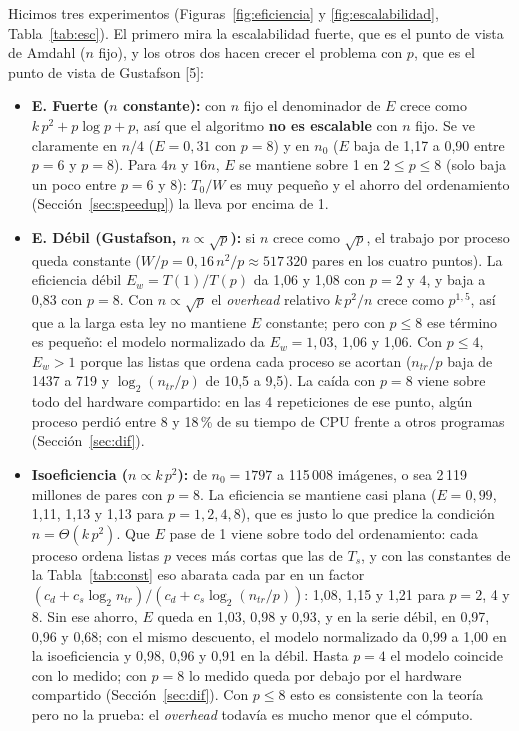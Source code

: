 \documentclass[11pt,a4paper]{article}
\newcommand{\ntr}{n_{tr}}
\begin{document}
Hicimos tres experimentos (Figuras~\ref{fig:eficiencia} y \ref{fig:escalabilidad}, Tabla~\ref{tab:esc}). El primero mira la escalabilidad fuerte, que es el punto de vista de Amdahl ($n$ fijo), y los otros dos hacen crecer el problema con $p$, que es el punto de vista de Gustafson [5]:
\begin{itemize}[nosep]
  \item \textbf{E. Fuerte ($n$ constante):} con $n$ fijo el denominador de $E$ crece como $k\,p^2 + p\log p + p$, así que el algoritmo \textbf{no es escalable} con $n$ fijo. Se ve claramente en $n/4$ ($E = 0{,}31$ con $p = 8$) y en $n_0$ ($E$ baja de 1,17 a 0,90 entre $p = 6$ y $p = 8$). Para $4n$ y $16n$, $E$ se mantiene sobre 1 en $2 \le p \le 8$ (solo baja un poco entre $p = 6$ y $8$): $T_0/W$ es muy pequeño y el ahorro del ordenamiento (Sección~\ref{sec:speedup}) la lleva por encima de 1.
  \item \textbf{E. Débil (Gustafson, $n \propto \sqrt{p}$):} si $n$ crece como $\sqrt{p}$, el trabajo por proceso queda constante ($W/p = 0{,}16\,n^2/p \approx 517\,320$ pares en los cuatro puntos). La eficiencia débil $E_w = T(1)/T(p)$ da 1,06 y 1,08 con $p = 2$ y $4$, y baja a 0,83 con $p = 8$. Con $n \propto \sqrt{p}$ el \textit{overhead} relativo $k\,p^2/n$ crece como $p^{1{,}5}$, así que a la larga esta ley no mantiene $E$ constante; pero con $p \le 8$ ese término es pequeño: el modelo normalizado da $E_w = 1{,}03$, 1,06 y 1,06. Con $p \le 4$, $E_w > 1$ porque las listas que ordena cada proceso se acortan ($\ntr/p$ baja de 1437 a 719 y $\log_2(\ntr/p)$ de 10,5 a 9,5). La caída con $p = 8$ viene sobre todo del hardware compartido: en las 4 repeticiones de ese punto, algún proceso perdió entre 8 y 18\,\% de su tiempo de CPU frente a otros programas (Sección~\ref{sec:dif}).
  \item \textbf{Isoeficiencia ($n \propto k\,p^2$):} de $n_0 = 1797$ a 115\,008 imágenes, o sea 2\,119 millones de pares con $p = 8$. La eficiencia se mantiene casi plana ($E = 0{,}99$, 1,11, 1,13 y 1,13 para $p = 1, 2, 4, 8$), que es justo lo que predice la condición $n = \Theta(k\,p^2)$. Que $E$ pase de 1 viene sobre todo del ordenamiento: cada proceso ordena listas $p$ veces más cortas que las de $T_s$, y con las constantes de la Tabla~\ref{tab:const} eso abarata cada par en un factor $(c_d + c_s\log_2\ntr)/(c_d + c_s\log_2(\ntr/p))$: 1,08, 1,15 y 1,21 para $p = 2$, 4 y 8. Sin ese ahorro, $E$ queda en 1,03, 0,98 y 0,93, y en la serie débil, en 0,97, 0,96 y 0,68; con el mismo descuento, el modelo normalizado da 0,99 a 1,00 en la isoeficiencia y 0,98, 0,96 y 0,91 en la débil. Hasta $p = 4$ el modelo coincide con lo medido; con $p = 8$ lo medido queda por debajo por el hardware compartido (Sección~\ref{sec:dif}). Con $p \le 8$ esto es consistente con la teoría pero no la prueba: el \textit{overhead} todavía es mucho menor que el cómputo.
\end{itemize}
\end{document}
